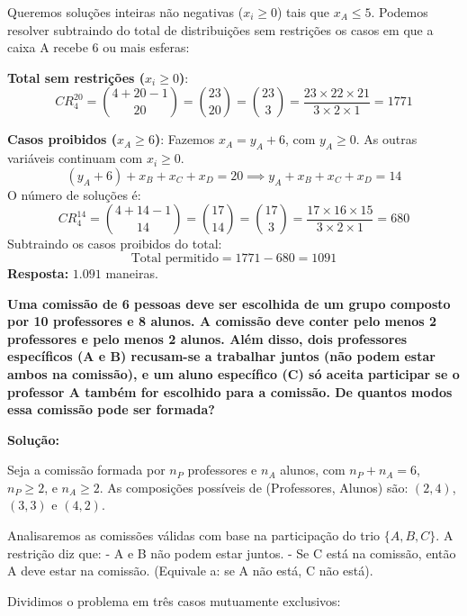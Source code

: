 \documentclass[a4paper,10pt,landscape,twocolumn]{article}  %
\let\oldenumerate\enumerate
\let\oldendenumerate\endenumerate
\renewenvironment{enumerate}{%
  \oldenumerate%
  \setlength{\itemsep}{1pt}%
  \setlength{\parskip}{0pt}%
  \setlength{\parsep}{0pt}%
  \setlength{\topsep}{2pt}%
  \setlength{\partopsep}{0pt}%
}{%
  \oldendenumerate%
}
\let\olditemize\itemize
\let\oldenditemize\enditemize
\renewenvironment{itemize}{%
  \olditemize%
  \setlength{\itemsep}{1pt}%
  \setlength{\parskip}{0pt}%
  \setlength{\parsep}{0pt}%
  \setlength{\topsep}{2pt}%
  \setlength{\partopsep}{0pt}%
}{%
  \oldenditemize%
}
\begin{document}
\begin{enumerate}
\begin{enumerate}
        \item Queremos soluções inteiras não negativas ($x_i \ge 0$) tais que $x_A \le 5$.
        Podemos resolver subtraindo do total de distribuições sem restrições os casos em que a caixa A recebe 6 ou mais esferas:
        \begin{itemize}
            \item \textbf{Total sem restrições ($x_i \ge 0$)}:
            \[ CR_4^{20} = \binom{4+20-1}{20} = \binom{23}{20} = \binom{23}{3} = \frac{23 \times 22 \times 21}{3 \times 2 \times 1} = 1771 \]
            \item \textbf{Casos proibidos ($x_A \ge 6$)}:
            Fazemos $x_A = y_A + 6$, com $y_A \ge 0$. As outras variáveis continuam com $x_i \ge 0$.
            \[ (y_A + 6) + x_B + x_C + x_D = 20 \implies y_A + x_B + x_C + x_D = 14 \]
            O número de soluções é:
            \[ CR_4^{14} = \binom{4+14-1}{14} = \binom{17}{14} = \binom{17}{3} = \frac{17 \times 16 \times 15}{3 \times 2 \times 1} = 680 \]
        \end{itemize}
        Subtraindo os casos proibidos do total:
        \[ \text{Total permitido} = 1771 - 680 = 1091 \]
        \textbf{Resposta:} $1.091$ maneiras.
    \end{enumerate}

    \item \textbf{Uma comissão de 6 pessoas deve ser escolhida de um grupo composto por 10 professores e 8 alunos. A comissão deve conter pelo menos 2 professores e pelo menos 2 alunos. Além disso, dois professores específicos (A e B) recusam-se a trabalhar juntos (não podem estar ambos na comissão), e um aluno específico (C) só aceita participar se o professor A também for escolhido para a comissão. De quantos modos essa comissão pode ser formada?}
    
    \textbf{Solução:}
    
    Seja a comissão formada por $n_P$ professores e $n_A$ alunos, com $n_P + n_A = 6$, $n_P \ge 2$, e $n_A \ge 2$. As composições possíveis de (Professores, Alunos) são: $(2,4)$, $(3,3)$ e $(4,2)$.
    
    Analisaremos as comissões válidas com base na participação do trio $\{A, B, C\}$. A restrição diz que:
    - A e B não podem estar juntos.
    - Se C está na comissão, então A deve estar na comissão. (Equivale a: se A não está, C não está).
    
    Dividimos o problema em três casos mutuamente exclusivos:
    

\end{enumerate}
\end{document}
